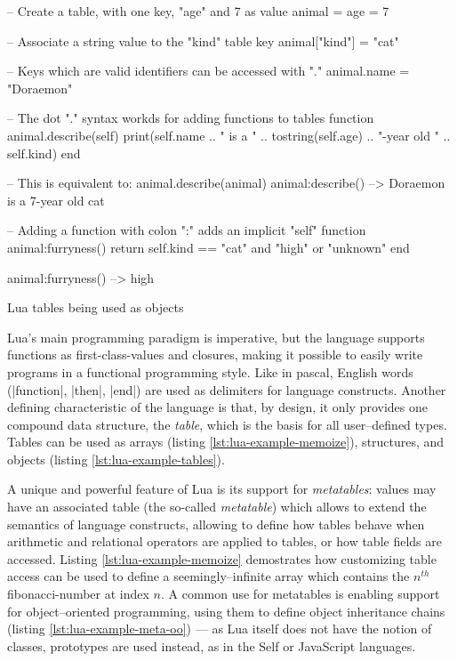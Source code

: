 \begin{listing}[H]
  \begin{luacode}
    -- Create a table, with one key, "age" and 7 as value
    animal = { age = 7 }

    -- Associate a string value to the "kind" table key
    animal["kind"] = "cat"

    -- Keys which are valid identifiers can be accessed with "."
    animal.name = "Doraemon"

    -- The dot "." syntax workds for adding functions to tables
    function animal.describe(self)
      print(self.name .. " is a " .. tostring(self.age) ..
            "-year old " .. self.kind)
    end

    -- This is equivalent to: animal.describe(animal)
    animal:describe()  --> Doraemon is a 7-year old cat

    -- Adding a function with colon ":" adds an implicit "self"
    function animal:furryness()
      return self.kind == "cat" and "high" or "unknown"
    end

    animal:furryness()  --> high
  \end{luacode}
	\caption{Lua tables being used as objects}
  \label{lst:lua-example-tables}
\end{listing}

Lua's main programming paradigm is imperative, but the language supports
functions as \glspl{first-class-value} and \glspl{closure}, making it possible
to easily write programs in a functional programming style. Like in
\gls{pascal}, English words (\Mlua|function|, \Mlua|then|, \Mlua|end|) are
used as delimiters for language constructs. Another defining characteristic of
the language is that, by design, it only provides one compound data structure,
the \emph{table}, which is the basis for all user--defined types. Tables can
be used as arrays (listing \ref{lst:lua-example-memoize}), structures, and
objects (listing \ref{lst:lua-example-tables}).

A unique and powerful feature of Lua is its support for \emph{metatables}:
values may have an associated table (the so-called \emph{metatable}) which
allows to extend the semantics of language constructs, allowing to define how
tables behave when arithmetic and relational operators are applied to tables,
or how table fields are accessed. Listing \vref{lst:lua-example-memoize}
demostrates how customizing table access can be used to define a
seemingly--infinite array which contains the $n^{th}$ \gls{fibonacci-number}
at index $n$. A common use for metatables is enabling support for
object--oriented programming, using them to define object inheritance chains
(listing \ref{lst:lua-example-meta-oo}) --- as Lua itself does not have the
notion of classes, prototypes are used instead, as in the Self or JavaScript
languages.

